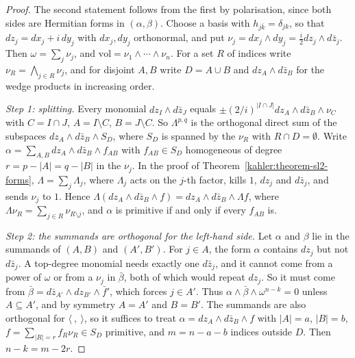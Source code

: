 \begin{proof}
The second statement follows from the first by polarisation, since both sides are Hermitian forms in $(\alpha, \beta)$. Choose a basis
with $h_{j\bar k} = \delta_{jk}$, so that $dz_j = dx_j + i\,dy_j$ with $dx_j, dy_j$ orthonormal, and put
$\nu_j = dx_j \wedge dy_j = \frac{i}{2}dz_j \wedge d\bar z_j$. Then $\omega = \sum_j\nu_j$, and $\mathrm{vol} = \nu_1 \wedge \cdots \wedge \nu_n$.
For a set $R$ of indices write $\nu_R = \bigwedge_{j \in R}\nu_j$, and for disjoint $A, B$ write $D = A \cup B$ and
$dz_A \wedge d\bar z_B$ for the wedge products in increasing order.

\emph{Step 1: splitting.} Every monomial $dz_I \wedge d\bar z_J$ equals $\pm(2/i)^{|I \cap J|}dz_A \wedge d\bar z_B \wedge \nu_C$ with
$C = I \cap J$, $A = I \setminus C$, $B = J \setminus C$. So $\Lambda^{p,q}$ is the orthogonal direct sum of the subspaces
$dz_A \wedge d\bar z_B \wedge S_D$, where $S_D$ is spanned by the $\nu_R$ with $R \cap D = \emptyset$. Write
$\alpha = \sum_{A,B}dz_A \wedge d\bar z_B \wedge f_{AB}$ with $f_{AB} \in S_D$ homogeneous of degree $r = p - |A| = q - |B|$ in the $\nu_j$. In the proof
of Theorem~\ref{kahler:theorem-sl2-forms}, $\Lambda = \sum_j\Lambda_j$, where $\Lambda_j$ acts on the $j$-th factor, kills $1$, $dz_j$
and $d\bar z_j$, and sends $\nu_j$ to $1$. Hence
$\Lambda(dz_A \wedge d\bar z_B \wedge f) = dz_A \wedge d\bar z_B \wedge \Lambda f$, where $\Lambda\nu_R = \sum_{j \in R}\nu_{R \setminus j}$, and
$\alpha$ is primitive if and only if every $f_{AB}$ is.

\emph{Step 2: the summands are orthogonal for the left-hand side.} Let $\alpha$ and $\beta$ lie in the summands of $(A, B)$ and
$(A', B')$. For $j \in A$, the form $\alpha$ contains $dz_j$ but not $d\bar z_j$. A top-degree monomial needs exactly one $d\bar z_j$, and it
cannot come from a power of $\omega$ or from a $\nu_j$ in $\bar\beta$, both of which would repeat $dz_j$. So it must come from
$\bar\beta = d\bar z_{A'} \wedge dz_{B'} \wedge \bar f'$, which forces $j \in A'$. Thus $\alpha \wedge \bar\beta \wedge \omega^{n-k} = 0$
unless $A \subseteq A'$, and by symmetry $A = A'$ and $B = B'$. The summands are also orthogonal for $\langle\ ,\ \rangle$, so it suffices
to treat $\alpha = dz_A \wedge d\bar z_B \wedge f$ with $|A| = a$, $|B| = b$, $f = \sum_{|R|=r}f_R\nu_R \in S_D$ primitive, and $m = n - a - b$
indices outside $D$. Then $n - k = m - 2r$.


\end{proof}
